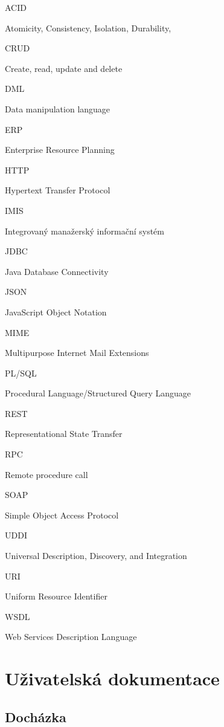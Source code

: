 \documentclass{diplomka}
\begin{document}
\begin{list}{}{\setlength{\leftmargin}{30mm}
\setlength{\labelwidth}{30mm} \setlength{\labelsep}{0mm} }
\item[\parbox{30mm}{ACID}] Atomicity, Consistency, Isolation, Durability,
\item[\parbox{30mm}{CRUD}] Create, read, update and delete
\item[\parbox{30mm}{DML}] Data manipulation language
\item[\parbox{30mm}{ERP}] Enterprise Resource Planning 
\item[\parbox{30mm}{HTTP}] Hypertext Transfer Protocol
\item[\parbox{30mm}{IMIS}] Integrovaný manažerský informační systém
\item[\parbox{30mm}{JDBC}] Java Database Connectivity
\item[\parbox{30mm}{JSON}] JavaScript Object Notation
\item[\parbox{30mm}{MIME}] Multipurpose Internet Mail Extensions
\item[\parbox{30mm}{PL/SQL}] Procedural Language/Structured Query Language
\item[\parbox{30mm}{REST}] Representational State Transfer
\item[\parbox{30mm}{RPC}] Remote procedure call
\item[\parbox{30mm}{SOAP}] Simple Object Access Protocol
\item[\parbox{30mm}{UDDI}] Universal Description, Discovery, and Integration
\item[\parbox{30mm}{URI}] Uniform Resource Identifier
\item[\parbox{30mm}{WSDL}] Web Services Description Language
\end{list}

\appendix
\sloppy

\begingroup
\raggedright

\endgroup

{}
\pagestyle{fancy}



\chapter{Uživatelská dokumentace}
\section{Docházka}
\end{document}
